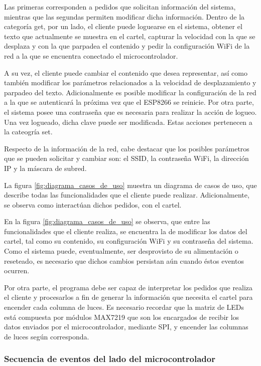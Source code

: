Las primeras corresponden a pedidos que solicitan información del sistema, mientras que las segundas permiten modificar dicha información.
Dentro de la categoría get, por un lado, el cliente puede loguearse en el sistema, obtener el texto que actualmente se muestra en el cartel, capturar la velocidad con la que se desplaza y con la que parpadea el contenido y pedir la configuración WiFi de la red a la que se encuentra conectado el microcontrolador.

A su vez, el cliente puede cambiar el contenido que desea representar, así como también modificar los parámetros relacionados a la velocidad de desplazamiento y parpadeo del texto.
Adicionalmente es posible modificar la configuración de la red a la que se autenticará la próxima vez que el ESP8266 se reinicie.
Por otra parte, el sistema posee una contraseña que es necesaria para realizar la acción de logueo.
Una vez logueado, dicha clave puede ser modificada. Estas acciones pertenecen a la cateogría set.

Respecto de la información de la red, cabe destacar que los posibles parámetros que se pueden solicitar y cambiar son: el SSID, la contraseña WiFi, la dirección IP y la máscara de subred.

La figura \ref{fig:diagrama_casos_de_uso} muestra un diagrama de casos de uso, que describe todas las funcionalidades que el cliente puede realizar.
Adicionalmente, se observa como interactúan dichos pedidos, con el cartel.


En la figura \ref{fig:diagrama_casos_de_uso} se observa, que entre las funcionalidades que el cliente realiza, se encuentra la de modificar los datos del cartel, tal como su contenido, su configuración WiFi y su contraseña del sistema.
Como el sistema puede, eventualmente, ser desprovisto de su alimentación o reseteado, es necesario que dichos cambios persistan aún cuando éstos eventos ocurren.

Por otra parte, el programa debe ser capaz de interpretar los pedidos que realiza el cliente y procesarlos a fin de generar la información que necesita el cartel para encender cada columna de luces.
Es necesario recordar que la matriz de LEDs está compuesta por módulos MAX7219 que son los encargados de recibir los datos enviados por el microcontrolador, mediante SPI, y encender las columnas de luces según corresponda.



\subsubsection{Secuencia de eventos del lado del microcontrolador}

